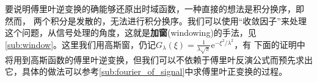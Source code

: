 要说明傅里叶逆变换的确能够还原出时域函数，一种直接的想法是积分换序，即
然而，
两个积分是发散的，无法进行积分换序。我们可以使用“收敛因子”来处理这个问题，从信号处理的角度，这就是\textbf{加窗}(windowing)的手法，见\ref{sub:window}。这里我们用高斯窗，仍记$G_\lambda(\xi)=\frac{1}{\lambda\sqrt{\pi}}\mathrm{e}^{-\xi^2/\lambda^2}$，有
下面的证明中将用到高斯函数的傅里叶逆变换，但我们可以不依赖于傅里叶反演公式而预先求出它，具体的做法可以参考\ref{sub:fourier_of_signal}中求傅里叶正变换的过程。
